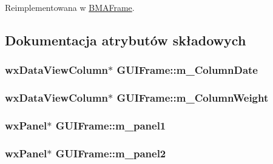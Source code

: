 Reimplementowana w \hyperlink{class_b_m_a_frame_aeadc0046b152d112f57466ad7bbb27f5}{B\+M\+A\+Frame}.



\subsection{Dokumentacja atrybutów składowych}
\hypertarget{class_g_u_i_frame_a230303f14bac3741946470f81d8a7c07}{
\subsubsection[{m\+\_\+\+Column\+Date}]{\setlength{\rightskip}{0pt plus 5cm}wx\+Data\+View\+Column$\ast$ G\+U\+I\+Frame\+::m\+\_\+\+Column\+Date\hspace{0.3cm}{\ttfamily [protected]}}}\label{class_g_u_i_frame_a230303f14bac3741946470f81d8a7c07}
\hypertarget{class_g_u_i_frame_a99b64129f2b8cf9d9a645be02830b298}{
\subsubsection[{m\+\_\+\+Column\+Weight}]{\setlength{\rightskip}{0pt plus 5cm}wx\+Data\+View\+Column$\ast$ G\+U\+I\+Frame\+::m\+\_\+\+Column\+Weight\hspace{0.3cm}{\ttfamily [protected]}}}\label{class_g_u_i_frame_a99b64129f2b8cf9d9a645be02830b298}
\hypertarget{class_g_u_i_frame_a332c2b34570ddce4d9b239367c132502}{
\subsubsection[{m\+\_\+panel1}]{\setlength{\rightskip}{0pt plus 5cm}wx\+Panel$\ast$ G\+U\+I\+Frame\+::m\+\_\+panel1\hspace{0.3cm}{\ttfamily [protected]}}}\label{class_g_u_i_frame_a332c2b34570ddce4d9b239367c132502}
\hypertarget{class_g_u_i_frame_a84a4073aff66334e308650ab2da932d0}{
\subsubsection[{m\+\_\+panel2}]{\setlength{\rightskip}{0pt plus 5cm}wx\+Panel$\ast$ G\+U\+I\+Frame\+::m\+\_\+panel2\hspace{0.3cm}{\ttfamily [protected]}}}\label{class_g_u_i_frame_a84a4073aff66334e308650ab2da932d0}
